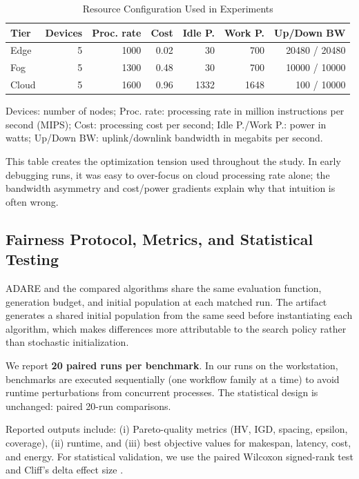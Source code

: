 \documentclass[preprint,12pt]{elsarticle}
\begin{document}
\begin{table}[H]
\caption{Resource Configuration Used in Experiments}
\label{tab:envjson}
\centering
\small
\begin{tabular*}{\textwidth}{@{\extracolsep{\fill}}lrrrrrr@{}}
\toprule
Tier & Devices & Proc. rate & Cost & Idle P. & Work P. & Up/Down BW \\
\midrule
Edge & 5 & 1000 & 0.02 & 30 & 700 & 20480 / 20480 \\
Fog & 5 & 1300 & 0.48 & 30 & 700 & 10000 / 10000 \\
Cloud & 5 & 1600 & 0.96 & 1332 & 1648 & 100 / 10000 \\
\bottomrule
\end{tabular*}
\vspace{0.3ex}
\begin{minipage}{\textwidth}
\footnotesize Devices: number of nodes; Proc. rate: processing rate in million instructions per second (MIPS); Cost: processing cost per second; Idle P./Work P.: power in watts; Up/Down BW: uplink/downlink bandwidth in megabits per second.
\end{minipage}
\end{table}

This table creates the optimization tension used throughout the study. In early debugging runs, it was easy to over-focus on cloud processing rate alone; the bandwidth asymmetry and cost/power gradients explain why that intuition is often wrong.

\subsection{Fairness Protocol, Metrics, and Statistical Testing}
ADARE and the compared algorithms share the same evaluation function, generation budget, and initial population at each matched run. The artifact generates a shared initial population from the same seed before instantiating each algorithm, which makes differences more attributable to the search policy rather than stochastic initialization.

We report \textbf{20 paired runs per benchmark}. In our runs on the workstation, benchmarks are executed sequentially (one workflow family at a time) to avoid runtime perturbations from concurrent processes. The statistical design is unchanged: paired 20-run comparisons.

Reported outputs include: (i) Pareto-quality metrics (HV, IGD, spacing, epsilon, coverage), (ii) runtime, and (iii) best objective values for makespan, latency, cost, and energy. For statistical validation, we use the paired Wilcoxon signed-rank test and Cliff's delta effect size \cite{wilcoxon1945,cliff1993}.
\end{document}
